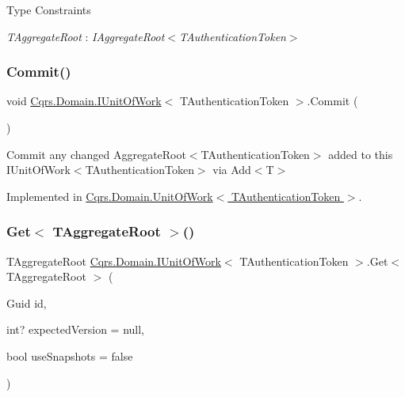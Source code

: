 \begin{Desc}
\item[Type Constraints]\begin{description}
\item[{\em T\+Aggregate\+Root} : {\em I\+Aggregate\+Root$<$T\+Authentication\+Token$>$}]\end{description}
\end{Desc}
\mbox{\label{interfaceCqrs_1_1Domain_1_1IUnitOfWork_ade600c9bf9e8380c24eaf1e7e0df6e01_ade600c9bf9e8380c24eaf1e7e0df6e01}} 
\subsubsection{\texorpdfstring{Commit()}{Commit()}}
{\footnotesize\ttfamily void \hyperlink{interfaceCqrs_1_1Domain_1_1IUnitOfWork}{Cqrs.\+Domain.\+I\+Unit\+Of\+Work}$<$ T\+Authentication\+Token $>$.Commit (\begin{DoxyParamCaption}{ }\end{DoxyParamCaption})}



Commit any changed Aggregate\+Root$<$\+T\+Authentication\+Token$>$ added to this I\+Unit\+Of\+Work$<$\+T\+Authentication\+Token$>$ via Add$<$\+T$>$ 



Implemented in \hyperlink{classCqrs_1_1Domain_1_1UnitOfWork_a132dd26611fc71d676727f71f1412edd_a132dd26611fc71d676727f71f1412edd}{Cqrs.\+Domain.\+Unit\+Of\+Work$<$ T\+Authentication\+Token $>$}.

\mbox{\label{interfaceCqrs_1_1Domain_1_1IUnitOfWork_aee78f81d472577a65356bc1c05207180_aee78f81d472577a65356bc1c05207180}} 
\subsubsection{\texorpdfstring{Get$<$ T\+Aggregate\+Root $>$()}{Get< TAggregateRoot >()}}
{\footnotesize\ttfamily T\+Aggregate\+Root \hyperlink{interfaceCqrs_1_1Domain_1_1IUnitOfWork}{Cqrs.\+Domain.\+I\+Unit\+Of\+Work}$<$ T\+Authentication\+Token $>$.Get$<$ T\+Aggregate\+Root $>$ (\begin{DoxyParamCaption}\item[{Guid}]{id,  }\item[{int?}]{expected\+Version = {\ttfamily null},  }\item[{bool}]{use\+Snapshots = {\ttfamily false} }\end{DoxyParamCaption})}



